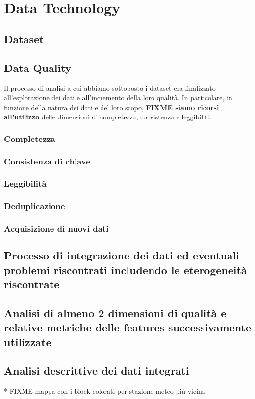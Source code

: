 \setcounter{chapter}{0}

\part{Data Technology}

\chapter{Dataset}

\chapter{Data Quality}
\label{chap:data-quality}
Il processo di analisi a cui abbiamo sottoposto i dataset era finalizzato 
all'esplorazione dei dati e all'incremento della loro qualità. In particolare, 
in funzione della natura dei dati e del loro scopo, \textbf{FIXME siamo ricorsi 
all'utilizzo} delle dimensioni di completezza, consistenza e leggibilità.


\section{Completezza}

\section{Consistenza di chiave}

\section{Leggibilità}

\section{Deduplicazione}

\section{Acquisizione di nuovi dati}

\chapter{Processo di integrazione dei dati ed eventuali problemi riscontrati 
includendo le eterogeneità riscontrate}
\label{chap:data-integration}



\chapter{Analisi di almeno 2 dimensioni di qualità e relative metriche delle features successivamente utilizzate}

\chapter{Analisi descrittive dei dati integrati}

* FIXME mappa con i block colorati per stazione meteo più vicina

